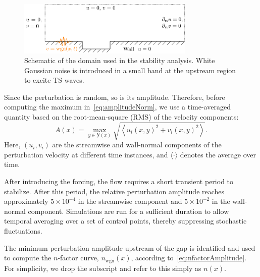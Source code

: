 \documentclass[../main.tex]{subfiles}
\begin{document}
\begin{figure}[ht]
	\centering
	\includegraphics[width=0.75\textwidth]{../../Images/domainPert.pdf}
	\caption{Schematic of the domain used in the stability analysis. White Gaussian noise is introduced in a small band at the upstream region to excite TS waves.}
	\label{fig:pertdomain}
\end{figure}
Since the perturbation is random, so is its amplitude. Therefore, before computing the maximum in~\cref{eq:amplitudeNorm}, we use a time-averaged quantity based on the root-mean-square (RMS) of the velocity components:
\begin{equation}
	A(x) = \max_{y \in \mathcal{Y}(x)} \sqrt{ \left\langle u_i(x,y)^2 + v_i(x,y)^2 \right\rangle }.
	\label{eq:amplitudeRMS}
\end{equation}
Here, $(u_i, v_i)$ are the streamwise and wall-normal components of the perturbation velocity at different time instances, and $\langle \cdot \rangle$ denotes the average over time.

After introducing the forcing, the flow requires a short transient period to stabilize. After this period, the relative perturbation amplitude reaches approximately $5 \times 10^{-4}$ in the streamwise component and $5 \times 10^{-2}$ in the wall-normal component. Simulations are run for a sufficient duration to allow temporal averaging over a set of control points, thereby suppressing stochastic fluctuations.

The minimum perturbation amplitude upstream of the gap is identified and used to compute the $n$-factor curve, $n_{\text{wgn}}(x)$, according to~\cref{eq:nfactorAmplitude}. For simplicity, we drop the subscript and refer to this simply as $n(x)$. 
\end{document}
